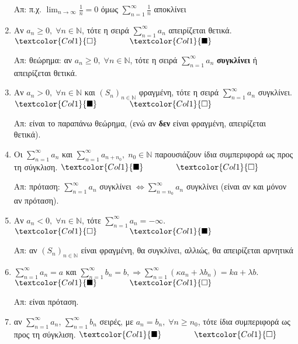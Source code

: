 \begin{enumerate}[itemsep=.5\baselineskip]
    Απ: π.χ. $ \lim_{n \to \infty} \frac{1}{n} = 0 $ όμως $ \sum_{n=1}^{\infty}
    \frac{1}{n} $ αποκλίνει 

  \item \textcolor{Col1}{Αν $ a_{n} \geq 0, \; \forall n \in
    \mathbb{N} $, τότε η σειρά $ \sum_{n=1}^{\infty} a_{n} $ απειρίζεται θετικά}.
    \hfill $\textcolor{Col1}{\square} \qquad \qquad \textcolor{Col1}{\blacksquare}$

    Απ: θεώρημα: αν $ a_{n} \geq 0, \; \forall n \in \mathbb{N} $, τότε η σειρά 
    $ \sum_{n=1}^{\infty} a_{n} $ \textbf{συγκλίνει} ή απειρίζεται θετικά.

  \item \textcolor{Col1}{Αν $ a_{n} > 0, \; \forall n \in \mathbb{N} $ και $ {(S_{n})}_{n
    \in \mathbb{N}}$ φραγμένη, τότε η σειρά $ \sum_{n=1}^{\infty} a_{n} $ συγκλίνει}.
    \hfill $\textcolor{Col1}{\blacksquare} \qquad \qquad \textcolor{Col1}{\square}$

    Απ: είναι το παραπάνω θεώρημα, (ενώ αν \textbf{δεν} είναι φραγμένη, απειρίζεται 
    θετικά). 

  \item \textcolor{Col1}{Οι $ \sum_{n=1}^{\infty} a_{n} $ και $
      \sum_{n=1}^{\infty} a_{n+ n_{0}}, \; n_{0} \in \mathbb{N} $ 
    παρουσιάζουν ίδια συμπεριφορά ως προς τη σύγκλιση}.
    \hfill $\textcolor{Col1}{\blacksquare} \qquad \qquad \textcolor{Col1}{\square}$

    Απ: πρόταση: $ \sum_{n=1}^{\infty} a_{n} $ συγκλίνει $ \Leftrightarrow
    \sum_{n=n_{0}}^{\infty} a_{n} $ συγκλίνει (είναι αν και μόνον αν πρόταση).

  \item \textcolor{Col1}{Αν $ a_{n} < 0, \; \forall n \in \mathbb{N} $, τότε $
    \sum_{n=1}^{\infty} a_{n} = - \infty $}.
    \hfill $\textcolor{Col1}{\square} \qquad \qquad \textcolor{Col1}{\blacksquare}$

    Απ: αν $ {(S_{n})}_{n \in \mathbb{N}} $ είναι φραγμένη, θα συγκλίνει, 
    αλλιώς, θα απειρίζεται αρνητικά 

  \item \textcolor{Col1}{$ \sum_{n=1}^{\infty} a_{n} = a $ και $ \sum_{n=1}^{\infty}
      b_{n} = b, \Rightarrow \sum_{n=1}^{\infty} (\kappa a_{n} + \lambda b_{n}) 
    = k a + \lambda b $}.
    \hfill $\textcolor{Col1}{\blacksquare} \qquad \qquad \textcolor{Col1}{\square}$

    Απ: είναι πρόταση. 

  \item \textcolor{Col1}{αν $ \sum_{n=1}^{\infty} a_{n} $, $ \sum_{n=1}^{\infty} b_{n} $ 
    σειρές, με $ a_{n}=b_{n}, \; \forall n \geq n_{0} $, τότε ίδια συμπεριφορά ως προς τη
  σύγκλιση}.
    \hfill $\textcolor{Col1}{\blacksquare} \qquad \qquad \textcolor{Col1}{\square}$


\end{enumerate}
